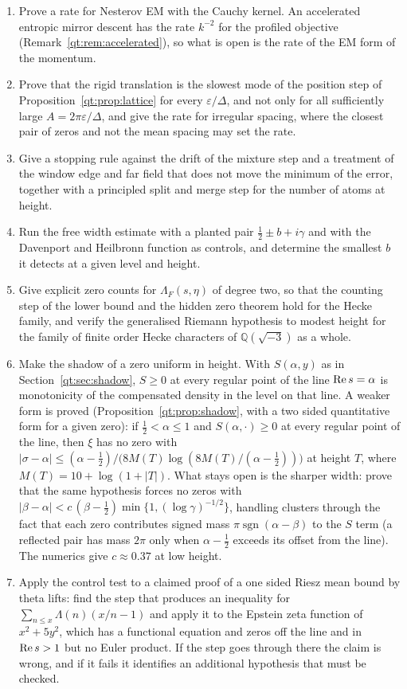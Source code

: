 \begin{enumerate}
\item\label{qt:op:rate} Prove a rate for Nesterov EM with the Cauchy kernel. An accelerated entropic mirror descent has the rate $k^{-2}$ for the profiled objective (Remark~\ref{qt:rem:accelerated}), so what is open is the rate of the EM form of the momentum.
\item\label{qt:op:lattice} Prove that the rigid translation is the slowest mode of the position step of Proposition~\ref{qt:prop:lattice} for every $\varepsilon/\Delta$, and not only for all sufficiently large $A=2\pi\varepsilon/\Delta$, and give the rate for irregular spacing, where the closest pair of zeros and not the mean spacing may set the rate.
\item\label{qt:op:stop} Give a stopping rule against the drift of the mixture step and a treatment of the window edge and far field that does not move the minimum of the error, together with a principled split and merge step for the number of atoms at height.
\item\label{qt:op:control} Run the free width estimate with a planted pair $\frac12\pm b+i\gamma$ and with the Davenport and Heilbronn function as controls, and determine the smallest $b$ it detects at a given level and height.
\item\label{qt:op:hecke} Give explicit zero counts for $\Lambda_F(s,\eta)$ of degree two, so that the counting step of the lower bound and the hidden zero theorem hold for the Hecke family, and verify the generalised Riemann hypothesis to modest height for the family of finite order Hecke characters of $\mathbb Q(\sqrt{-3})$ as a whole.
\item\label{qt:op:shadow} Make the shadow of a zero uniform in height. With $S(\alpha,y)$ as in Section~\ref{qt:sec:shadow}, $S\ge0$ at every regular point of the line $\operatorname{Re} s=\alpha$ is monotonicity of the compensated density in the level on that line. A weaker form is proved (Proposition~\ref{qt:prop:shadow}, with a two sided quantitative form for a given zero): if $\frac12<\alpha\le1$ and $S(\alpha,\cdot)\ge0$ at every regular point of the line, then $\xi$ has no zero with $|\sigma-\alpha|\le(\alpha-\frac12)/\big(8M(T)\log(8M(T)/(\alpha-\frac12))\big)$ at height $T$, where $M(T)=10+\log(1+|T|)$. What stays open is the sharper width: prove that the same hypothesis forces no zeros with $|\beta-\alpha|<c\,(\beta-\frac12)\min\{1,(\log\gamma)^{-1/2}\}$, handling clusters through the fact that each zero contributes signed mass $\pi\operatorname{sgn}(\alpha-\beta)$ to the $S$ term (a reflected pair has mass $2\pi$ only when $\alpha-\frac12$ exceeds its offset from the line). The numerics give $c\approx0.37$ at low height.
\item\label{qt:op:epstein} Apply the control test to a claimed proof of a one sided Riesz mean bound by theta lifts: find the step that produces an inequality for $\sum_{n\le x}\Lambda(n)(x/n-1)$ and apply it to the Epstein zeta function of $x^2+5y^2$, which has a functional equation and zeros off the line and in $\operatorname{Re} s>1$ but no Euler product. If the step goes through there the claim is wrong, and if it fails it identifies an additional hypothesis that must be checked.
\end{enumerate}
